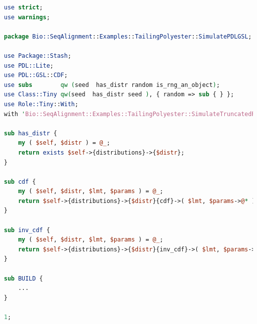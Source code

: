 \documentclass[10pt]{article}
\begin{document}
\begin{appendices}
\begin{lstlisting}[language=Perl,basicstyle=\footnotesize,frame=single,caption={Consumer module for truncated random number generation.},label={lst:ConsumerPDL},captionpos=b]
use strict;
use warnings;

package Bio::SeqAlignment::Examples::TailingPolyester::SimulatePDLGSL;

use Package::Stash;
use PDL::Lite;
use PDL::GSL::CDF;
use subs        qw (seed  has_distr random is_rng_an_object);
use Class::Tiny qw(seed  has_distr seed ), { random => sub { } };
use Role::Tiny::With;
with 'Bio::SeqAlignment::Examples::TailingPolyester::SimulateTruncatedRNGPDL';

sub has_distr {
    my ( $self, $distr ) = @_;
    return exists $self->{distributions}->{$distr};
}

sub cdf {
    my ( $self, $distr, $lmt, $params ) = @_;
    return $self->{distributions}->{$distr}{cdf}->( $lmt, $params->@* );
}

sub inv_cdf {
    my ( $self, $distr, $lmt, $params ) = @_;
    return $self->{distributions}->{$distr}{inv_cdf}->( $lmt, $params->@* );
}

sub BUILD {
    ...
}

1;
\end{lstlisting}
\end{appendices}
\end{document}
